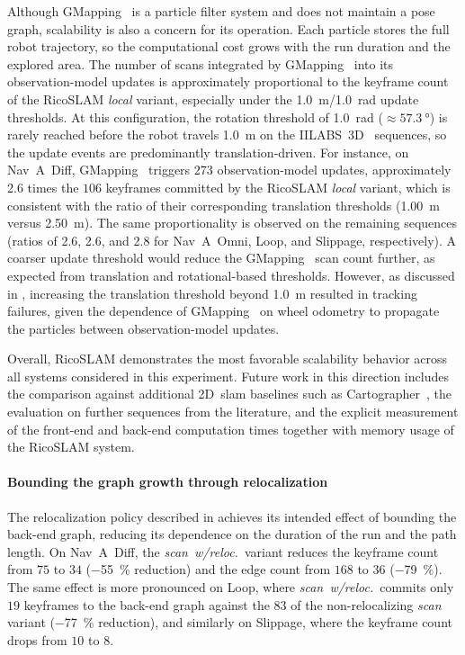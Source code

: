 Although GMapping~\cite{grisetti:tro:2007} is a particle filter system
and does not maintain a pose graph, scalability is also a concern for
its operation. Each particle stores the full robot trajectory, so
the computational cost grows with the run duration and the explored area.
The number of scans integrated by GMapping~\cite{grisetti:tro:2007} into
its observation-model updates is approximately proportional to the keyframe
count of the RicoSLAM \emph{local} variant, especially under the
\SI{1.0}{\metre}/\SI{1.0}{\radian} update thresholds. At this
configuration, the rotation threshold of \SI{1.0}{\radian}
($\approx \SI{57.3}{\degree}$) is rarely reached before the robot
travels \SI{1.0}{\metre} on the IILABS~3D~\cite{ribeiro:access:2025}
sequences, so the update events are predominantly translation-driven.
For instance, on Nav~A~Diff, GMapping~\cite{grisetti:tro:2007} triggers
$273$ observation-model updates, approximately \num{2.6} times the
$106$ keyframes committed by the RicoSLAM \emph{local} variant, which
is consistent with the ratio of their corresponding translation
thresholds (\SI{1.00}{\metre} versus \SI{2.50}{\metre}).
The same proportionality is observed on the remaining sequences (ratios of
\num{2.6}, \num{2.6}, and \num{2.8} for Nav~A~Omni, Loop, and Slippage,
respectively). A coarser update threshold would reduce the
GMapping~\cite{grisetti:tro:2007} scan count further, as expected from
translation and rotational-based thresholds. However, as
discussed in , increasing the
translation threshold beyond \SI{1.0}{\metre} resulted in tracking
failures, given the dependence of GMapping~\cite{grisetti:tro:2007} on
wheel odometry to propagate the particles between observation-model updates.

Overall, RicoSLAM demonstrates the most favorable scalability behavior
across all systems considered in this experiment. Future work in this direction
includes the comparison against additional 2D~\gls{slam} baselines such as
Cartographer~\cite{hess:icra:2016}, the evaluation on further sequences from
the literature, and the explicit measurement of the front-end and back-end
computation times together with memory usage of the RicoSLAM system.

\paragraph{Bounding the graph growth through relocalization}
The relocalization policy described in
 achieves its intended effect
of bounding the back-end graph, reducing its dependence on the
duration of the run and the path length.
On Nav~A~Diff, the \emph{scan~w/reloc.}\ variant reduces the keyframe
count from $75$ to $34$ (\SI{-55}{\percent} reduction) and the edge
count from $168$ to $36$ (\SI{-79}{\percent}). The same effect is
more pronounced on Loop, where \emph{scan~w/reloc.}\ commits only
$19$ keyframes to the back-end graph against the $83$ of the non-relocalizing
\emph{scan} variant (\SI{-77}{\percent} reduction), and similarly on Slippage,
where the keyframe count drops from $10$ to $8$.

